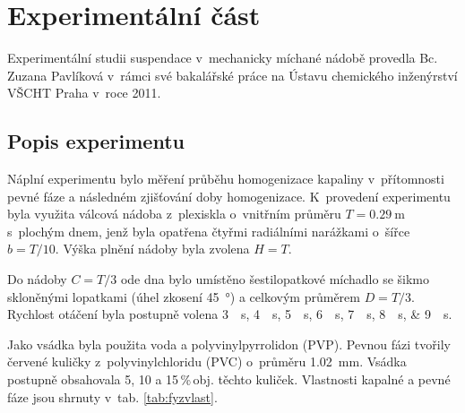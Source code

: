 \chapter{Experimentální část}
Experimentální studii suspendace v~mechanicky míchané nádobě provedla Bc.\,Zuzana Pavlíková v~rámci své bakalářské práce na Ústavu chemického inženýrství VŠCHT Praha v~roce 2011.

\section{Popis experimentu}
\label{chap:exp}
Náplní experimentu bylo měření průběhu homogenizace kapaliny v~přítomnosti pevné fáze a následném zjišťování doby homogenizace. K~provedení experimentu byla využita válcová nádoba z~plexiskla o~vnitřním průměru $T=\SI{0.29}{\meter}$ s~plochým dnem, jenž byla opatřena čtyřmi radiálními narážkami o~šířce $b=T/10$. Výška plnění nádoby byla zvolena $H=T$. 

Do nádoby $C=T/3$ ode dna bylo umístěno šestilopatkové míchadlo se šikmo skloněnými lopatkami (úhel zkosení \SI{45}{\degree}) a celkovým průměrem  $D=T/3$. Rychlost otáčení byla postupně volena  \SIlist[list-units = single]{3;4;5;6;7;8;9}{\per\second}.

Jako vsádka byla použita voda a polyvinylpyrrolidon (PVP). Pevnou fázi tvořily červené kuličky z~polyvinylchloridu (PVC) o~průměru \SI{1.02}{\milli\meter}. Vsádka postupně obsahovala 5, 10 a 15\,\%\,obj. těchto kuliček. Vlastnosti kapalné a pevné fáze jsou shrnuty v~tab. \ref{tab:fyzvlast}. 


